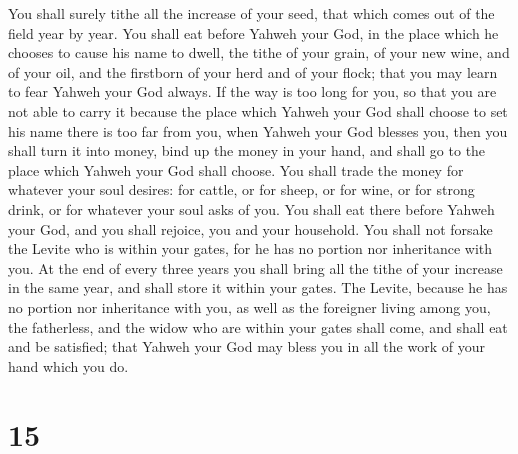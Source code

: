  You shall surely tithe all the increase of your seed, that
which comes out of the field year by year.  You shall eat
before Yahweh your God, in the place which he chooses to cause his name
to dwell, the tithe of your grain, of your new wine, and of your oil,
and the firstborn of your herd and of your flock; that you may learn to
fear Yahweh your God always.  If the way is too long for
you, so that you are not able to carry it because the place which Yahweh
your God shall choose to set his name there is too far from you, when
Yahweh your God blesses you,  then you shall turn it into
money, bind up the money in your hand, and shall go to the place which
Yahweh your God shall choose.  You shall trade the money
for whatever your soul desires: for cattle, or for sheep, or for wine,
or for strong drink, or for whatever your soul asks of you. You shall
eat there before Yahweh your God, and you shall rejoice, you and your
household.  You shall not forsake the Levite who is within
your gates, for he has no portion nor inheritance with you.
 At the end of every three years you shall bring all the
tithe of your increase in the same year, and shall store it within your
gates.  The Levite, because he has no portion nor
inheritance with you, as well as the foreigner living among you, the
fatherless, and the widow who are within your gates shall come, and
shall eat and be satisfied; that Yahweh your God may bless you in all
the work of your hand which you do.

\hypertarget{section-14}{%
\section{15}\label{section-14}}

